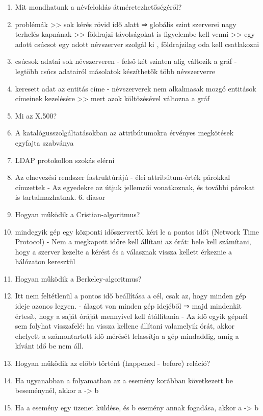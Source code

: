 \documentclass[twoside, a4paper, 12pt]{article}
\begin{document}
\begin{enumerate}
    \item  Mit mondhatunk a névfeloldás átméretezhetőségéről?
    \item problémák 
        >> sok kérés rövid idő alatt ⇒ globális szint szerverei nagy terhelés kapnának
        >> földrajzi távolságokat is figyelembe kell venni
        >> egy adott csúcsot egy adott névszerver szolgál ki , földrajzilag oda kell csatlakozni
    \item csúcsok adatai sok névszerveren
        - felső két szinten alig változik a gráf
        - legtöbb csúcs adatairól másolatok készíthetők több névszerverre
    \item keresett adat az entitás címe
        - névszerverek nem alkalmasak mozgó entitások címeinek kezelésére >>  mert azok költözésével változna a gráf
    \item  Mi az X.500?
    \item A katalógusszolgáltatásokban az attribútumokra érvényes megkötések egyfajta szabványa
    \item LDAP protokollon szokás elérni 
    \item Az elnevezési rendszer fastruktúrájú
        - élei attribútum-érték párokkal címzettek
        - Az egyedekre az útjuk jellemzői vonatkoznak, és további párokat is tartalmazhatnak.
        6. diasor
    \item  Hogyan működik a Cristian-algoritmus?
    \item mindegyik gép egy központi időszervertől kéri le a pontos időt (Network Time Protocol)	
        - Nem a megkapott időre kell állítani az órát: bele kell számítani, hogy 
        a szerver kezelte a kérést és a válasznak vissza kellett érkeznie a hálózaton keresztül
    \item  Hogyan működik a Berkeley-algoritmus?
    \item Itt nem feltétlenül a pontos idő beállítása a cél, csak az, hogy minden gép ideje azonos legyen.
        - álagot von minden gép idejéből
        ⇒ majd mindenkit értesít, hogy a saját óráját mennyivel kell átállítania
        - Az idő egyik gépnél sem folyhat visszafelé: ha vissza kellene állítani valamelyik órát,
        akkor ehelyett a számontartott idő mérését lelassítja a gép mindaddig, amíg a kívánt idő be nem áll.
    \item  Hogyan működik az előbb történt (happened - before) reláció?
    \item Ha ugyanabban a folyamatban az a esemény korábban következett be beseménynél, akkor a -> b
    \item Ha a esemény egy üzenet küldése, és b esemény annak fogadása, akkor a -> b

\end{enumerate}
\end{document}
